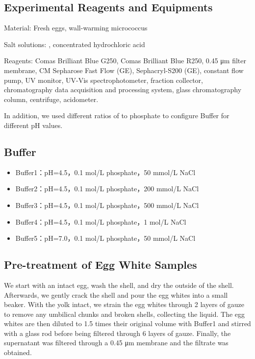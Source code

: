 \subsection{Experimental Reagents and Equipments}

Material: Fresh eggs, wall-warming micrococcus

Salt solutions: , concentrated hydrochloric acid

Reagents: Comas Brilliant Blue G250, Comas Brilliant Blue R250, 0.45 μm filter
membrane, CM Sepharose Fast Flow (GE), Sephacryl-S200 (GE), constant
flow pump, UV monitor, UV-Vis spectrophotometer, fraction collector,
chromatography data acquisition and processing system, glass
chromatography column, centrifuge, acidometer.


In addition, we used different ratios of  to phosphate to configure Buffer for different pH values.

\subsection{Buffer}
\begin{itemize}
	\item Buffer1：pH=4.5，0.1 mol/L phosphate，50 mmol/L NaCl 
	\item Buffer2：pH=4.5，0.1 mol/L phosphate，200 mmol/L NaCl 
	\item Buffer3：pH=4.5，0.1 mol/L phosphate，500 mmol/L NaCl 
	\item Buffer4：pH=4.5，0.1 mol/L phosphate，1 mol/L NaCl 
	\item Buffer5：pH=7.0，0.1 mol/L phosphate，50 mmol/L NaCl
\end{itemize}

\subsection{Pre-treatment of Egg White
		Samples}

We start with an intact egg, wash the shell, and dry the outside of the
shell. Afterwards, we gently crack the shell and pour the egg whites
into a small beaker. With the yolk intact, we strain the egg whites
through 2 layers of gauze to remove any umbilical chunks and broken
shells, collecting the liquid. The egg whites are then diluted to 1.5
times their original volume with Buffer1 and stirred with a glass rod
before being filtered through 6 layers of gauze. Finally, the
supernatant was filtered through a 0.45 μm membrane and the filtrate was
obtained.

